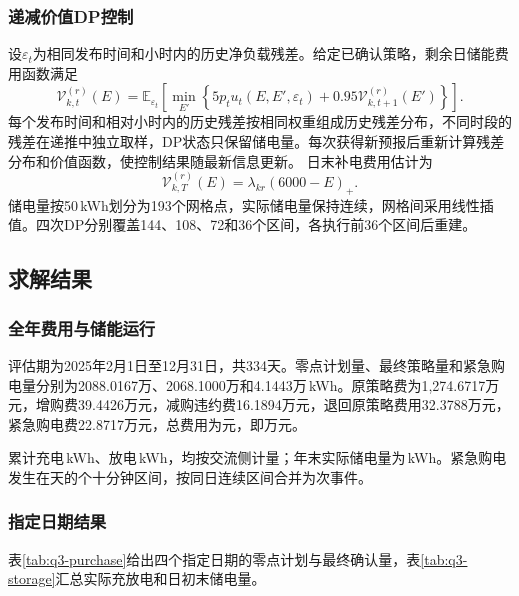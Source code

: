 \subsubsection{递减价值DP控制}

设$\varepsilon_t$为相同发布时间和小时内的历史净负载残差。给定已确认策略，剩余日储能费用函数满足
\begin{equation}
 \mathcal V_{k,t}^{(r)}(E)=
 \mathbb E_{\varepsilon_t}\!\left[
 \min_{E'}\left\{5p_tu_t(E,E',\varepsilon_t)
 +0.95\mathcal V_{k,t+1}^{(r)}(E')\right\}\right].
 \label{eq:q3-value-dp}
\end{equation}
每个发布时间和相对小时内的历史残差按相同权重组成历史残差分布，不同时段的残差在递推中独立取样，DP状态只保留储电量。每次获得新预报后重新计算残差分布和价值函数，使控制结果随最新信息更新。
日末补电费用估计为
\begin{equation}
 \mathcal V_{k,T}^{(r)}(E)=\lambda_{kr}(6000-E)_+.
 \label{eq:q3-terminal-value}
\end{equation}
储电量按50\,kWh划分为193个网格点，实际储电量保持连续，网格间采用线性插值。四次DP分别覆盖144、108、72和36个区间，各执行前36个区间后重建。

\subsection{求解结果}

\subsubsection{全年费用与储能运行}

评估期为2025年2月1日至12月31日，共334天。零点计划量、最终策略量和紧急购电量分别为2088.0167万、2068.1000万和4.1443万\,kWh。原策略费为1,274.6717万元，增购费39.4426万元，减购违约费16.1894万元，退回原策略费用32.3788万元，紧急购电费22.8717万元，总费用为\QthreeCost{}元，即\QthreeCostWan{}万元。

累计充电\QthreeCharge\,kWh、放电\QthreeDischarge\,kWh，均按交流侧计量；年末实际储电量为\QthreeEnd\,kWh。紧急购电发生在\QthreeEmergencyDays{}天的\QthreeEmergencyIntervals{}个十分钟区间，按同日连续区间合并为\QthreeEvents{}次事件。

\subsubsection{指定日期结果}

表\ref{tab:q3-purchase}给出四个指定日期的零点计划与最终确认量，表\ref{tab:q3-storage}汇总实际充放电和日初末储电量。

